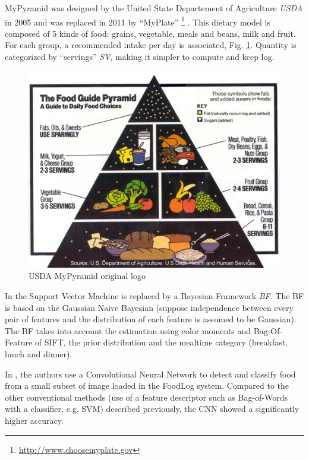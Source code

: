 MyPyramid \cite{MyPyramid} was designed by the United State Departement of Agriculture \textit{USDA} in 2005 and was replaced in 2011 by \enquote{MyPlate} \footnote{\url{http://www.choosemyplate.gov}} \cite{MyPlate}. This dietary model is composed of 5 kinds of food: grains, vegetable, meals and beans, milk and fruit. For each group, a recommended intake per day is associated, Fig. \ref{fig:my_pyramid}. Quantity is categorized by \enquote{servings} \textit{SV}, making it simpler to compute and keep log.

\begin{figure}
    \centering
    \includegraphics[scale=0.8]{img/my_pyramid.jpg}
    \caption{USDA MyPyramid original logo}
    \label{fig:my_pyramid}
\end{figure}

In \cite{Aizawa2013} the Support Vector Machine is replaced by a Bayesian Framework \textit{BF}.
The BF is based on the Gaussian Naive Bayesian (suppose independence between every pair of features and the distribution of each feature is assumed to be Gaussian). The BF takes into account the estimation using color moments and Bag-Of-Feature of SIFT, the prior distribution and the mealtime category (breakfast, lunch and dinner).

In \cite{Kagaya2014}, the authors use a Convolutional Neural Network  to detect and classify food from a small subset of image loaded in the FoodLog system. Compared to the other conventional methods (use of a feature descriptor such as Bag-of-Words with a classifier, e.g. SVM) described previously, the CNN showed a significantly higher accuracy.

